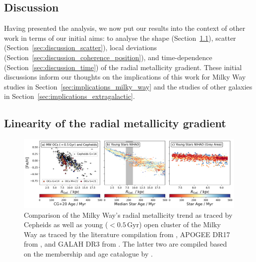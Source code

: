 \documentclass[twocolumn,apj,numberedappendix,appendixfloats,twocolappendix]{openjournal}
\newcommand{\nihaoAGEmax}{$0.5\,\mathrm{Gyr}$}
\begin{document}
\begin{CJK*}{UTF8}{gbsn}
\section{Discussion} \label{sec:discussion}

Having presented the analysis, we now put our results into the context of other work in terms of our initial aims: to analyse the shape (Section~\ref{sec:discussion_linearity}), scatter (Section~\ref{sec:discussion_scatter}), local deviations (Section~\ref{sec:discussion_coherence_position}), and time-dependence (Section~\ref{sec:discussion_time}) of the radial metallicity gradient. These initial discussions inform our thoughts on the implications of this work for Milky Way studies in Section~\ref{sec:implications_milky_way} and the studies of other galaxies in Section~\ref{sec:implications_extragalactic}.

\subsection{Linearity of the radial metallicity gradient} \label{sec:discussion_linearity}

\begin{figure}
    \centering
    \includegraphics[width=\textwidth]{figures/radial_metallicity_gradients_mw_vs_nihao.png}
    \caption{Comparison of the Milky Way's radial metallicity trend as traced by Cepheids \citep[black triangles, compiled from literature by][G+14]{Genovali2014} as well as young ($<$\nihaoAGEmax) open cluster of the Milky Way as traced by the literature compilation from \citet[][G+14 as squares]{Genovali2014}, APOGEE DR17 from \citet[][M+22 as crosses]{Myers2022}, and GALAH DR3 from \citet[][S+21 as circles]{Spina2021}. The latter two are compiled based on the membership and age catalogue by \citet[][CG+20]{CantatGaudin2020}.
    }
    \label{fig:radial_metallicity_gradients_mw_vs_nihao}
\end{figure}


\end{CJK*}
\end{document}

